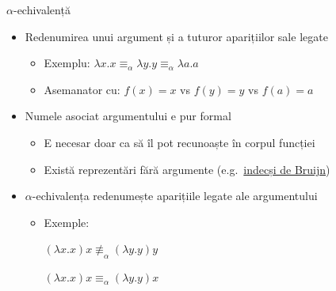 \documentclass[xcolor=pdftex,romanian,colorlinks]{beamer}
\begin{document}
\begin{frame}{\(\alpha\)-echivalență}

\begin{itemize}

\item
  Redenumirea unui argument și a tuturor aparițiilor sale legate

  \begin{itemize}
  
  \item
    Exemplu:
    \(\lambda x . x \equiv_\alpha \lambda y . y \equiv_\alpha \lambda a . a\)
  \item
    Asemanator cu: \(f(x) = x\) vs \(f(y) = y\) vs \(f(a) = a\)
  \end{itemize}
\item
  Numele asociat argumentului e pur formal

  \begin{itemize}
  
  \item
    E necesar doar ca să îl pot recunoaște în corpul funcției
  \item
    Există reprezentări fără argumente
    (e.g.~\href{https://en.wikipedia.org/wiki/De_Bruijn_index}{indecși
    de Bruijn})
  \end{itemize}
\item
  \(\alpha\)-echivalența redenumește  aparițiile legate ale
  argumentului

  \begin{itemize}
  \item
    Exemple:

    \((\lambda x . x) x \not\equiv_\alpha (\lambda y . y) y\)

    \((\lambda x . x) x \equiv_\alpha (\lambda y . y) x\)
  \end{itemize}
\end{itemize}

\end{frame}
\end{document}
